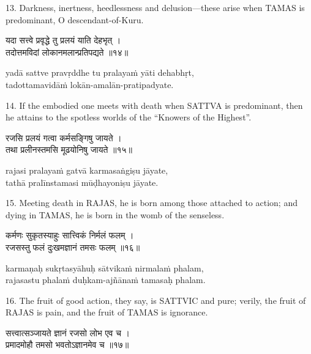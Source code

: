 13. Darkness, inertness, heedlessness and delusion---these arise when TAMAS is
predominant, O descendant-of-Kuru.

\begin{gitaverse}
यदा सत्त्वे प्रवृद्धे तु प्रलयं याति देहभृत् । \\
तदोत्तमविदां लोकानमलान्प्रतिपद्यते ॥१४॥
\end{gitaverse}

\begin{transliteration}
yadā sattve pravṛddhe tu pralayaṁ yāti dehabhṛt, \\
tadottamavidāṁ lokān-amalān-pratipadyate.
\end{transliteration}

14. If the embodied one meets with death when SATTVA is predominant, then he
attains to the spotless worlds of the ``Knowers of the Highest''.

\begin{gitaverse}
रजसि प्रलयं गत्वा कर्मसङ्गिषु जायते । \\
तथा प्रलीनस्तमसि मूढयोनिषु जायते ॥१५॥
\end{gitaverse}

\begin{transliteration}
rajasi pralayaṁ gatvā karmasaṅgiṣu jāyate, \\
tathā pralīnstamasi mūḍhayoniṣu jāyate.
\end{transliteration}

15. Meeting death in RAJAS, he is born among those attached to action; and
dying in TAMAS, he is born in the womb of the senseless.

\begin{gitaverse}
कर्मणः सुकृतस्याहुः सात्त्विकं निर्मलं फलम् । \\
रजसस्तु फलं दुःखमज्ञानं तमसः फलम् ॥१६॥
\end{gitaverse}

\begin{transliteration}
karmaṇaḥ sukṛtasyāhuḥ sātvikaṁ nirmalaṁ phalam, \\
rajasastu phalaṁ duḥkam-ajñānaṁ tamasaḥ phalam.
\end{transliteration}

16. The fruit of good action, they say, is SATTVIC and pure; verily, the fruit
of RAJAS is pain, and the fruit of TAMAS is ignorance.

\begin{gitaverse}
सत्त्वात्सञ्जायते ज्ञानं रजसो लोभ एव च । \\
प्रमादमोहौ तमसो भवतोऽज्ञानमेव च ॥१७॥
\end{gitaverse}

